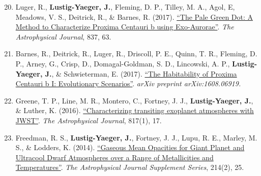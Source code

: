 \documentclass[margin,10pt]{res}
\newenvironment{benumerate}[1]{
    \let\oldItem\item
    \def\item{\addtocounter{enumi}{-2}\oldItem}
    \begin{enumerate}
    \setcounter{enumi}{#1}
    \addtocounter{enumi}{1}
}{
    \end{enumerate}
}
\begin{document}
\begin{resume}
\begin{benumerate}{19}
                    \item Luger, R., \textbf{Lustig-Yaeger, J.}, Fleming, D. P., Tilley, M. A., Agol, E, Meadows, V. S., Deitrick, R., \& Barnes, R. (2017). \href{http://adsabs.harvard.edu/abs/2017ApJ...837...63L}{``The Pale Green Dot: A Method to Characterize Proxima Centauri b using Exo-Aurorae''}. \textit{The Astrophysical Journal}, 837, 63.
                    \item Barnes, R., Deitrick, R., Luger, R., Driscoll, P. E., Quinn, T. R., Fleming, D. P., Arney, G., Crisp, D., Domagal-Goldman, S. D., Lincowski, A. P., \textbf{Lustig-Yaeger, J.}, \& Schwieterman, E. (2017). \href{http://adsabs.harvard.edu/cgi-bin/bib_query?arXiv:1608.06919}{``The Habitability of Proxima Centauri b I: Evolutionary Scenarios''}. \textit{arXiv preprint arXiv:1608.06919.}
                    \item Greene, T. P., Line, M. R., Montero, C., Fortney, J. J., \textbf{Lustig-Yaeger, J.}, \& Luther, K. (2016). \href{http://adsabs.harvard.edu/abs/2016ApJ...817...17G}{``Characterizing transiting exoplanet atmospheres with JWST''}. \textit{The Astrophysical Journal}, 817(1), 17.
                    \item Freedman, R. S., \textbf{Lustig-Yaeger, J.}, Fortney, J. J., Lupu, R. E., Marley, M. S., \& Lodders, K. (2014). \href{http://adsabs.harvard.edu/abs/2014ApJS..214...25F}{``Gaseous Mean Opacities for Giant Planet and Ultracool Dwarf Atmospheres over a Range of Metallicities and Temperatures''}. \textit{The Astrophysical Journal Supplement Series}, 214(2), 25.\\
                \end{benumerate}
                 
                 

\end{resume}
\end{document}
